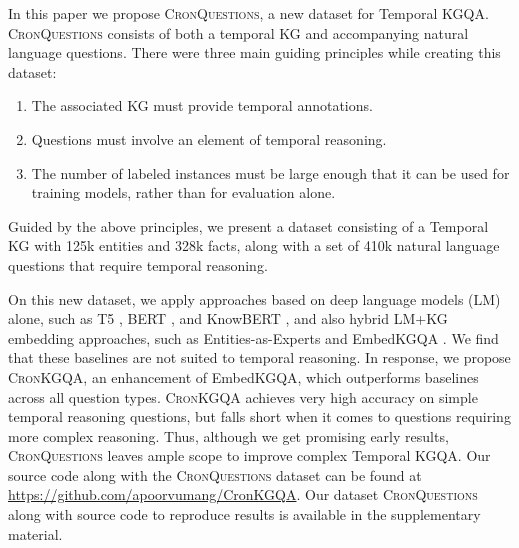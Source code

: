 \documentclass[11pt,a4paper]{article}
\newcommand{\method}{\textsc{CronKGQA}}
\newcommand{\dataset}{\textsc{CronQuestions}}
\begin{document}
In this paper we propose \dataset{}, a new dataset for Temporal KGQA. \dataset{} consists of both a temporal KG and accompanying natural language questions. There were three main guiding principles while creating this dataset:
\begin{enumerate}
    \item The associated KG must provide temporal annotations.
    \item Questions must involve an element of temporal reasoning.
    \item The number of labeled instances must be large enough that it can be used for training models, rather than for evaluation alone.
\end{enumerate}
Guided by the above principles, we present a dataset consisting of a Temporal KG with 125k entities and 328k facts, along with a set of 410k natural language questions that require temporal reasoning.

On this new dataset, we apply approaches based on deep language models (LM) alone, such as T5 \citep{raffel2020exploring}, BERT \citep{devlin2019bert}, and KnowBERT \citep{peters2019knowledge}, and also hybrid LM+KG embedding approaches, such as Entities-as-Experts \citep{fevry2020entexperts} and EmbedKGQA \citep{saxena-etal-2020-improving}. We find that these baselines are not suited to temporal reasoning.  In response, we propose \method{}, an enhancement of EmbedKGQA, which outperforms baselines across all question types. \method{} achieves very high accuracy on simple temporal reasoning questions, but falls short when it comes to questions requiring more complex reasoning. Thus, although we get promising early results, \dataset{} leaves ample scope to improve complex Temporal KGQA.
\ifaclfinal 
    Our source code along with the \dataset{} dataset can be found at \url{https://github.com/apoorvumang/CronKGQA}.
\else
    Our dataset \dataset{} along with source code to reproduce results is available in the supplementary material. 
\fi
\end{document}
